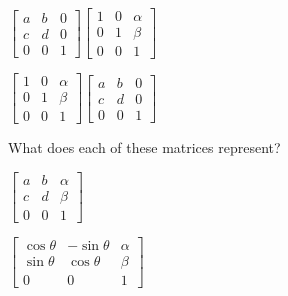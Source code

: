 \documentclass[../gatm_answers.tex]{subfiles}
\begin{document}
\begin{inner_problem}[start=1]
\item $\left[\begin{array}{ccc}a & b & 0 \\ c & d & 0 \\ 0 & 0 & 1 \end{array}\right]\left[\begin{array}{ccc} 1 & 0 & \alpha \\ 0 & 1 & \beta \\ 0 & 0 & 1 \end{array}\right]$
\end{inner_problem}

\begin{inner_problem}
\item $\left[\begin{array}{ccc} 1 & 0 & \alpha \\ 0 & 1 & \beta \\ 0 & 0 & 1 \end{array}\right]\left[\begin{array}{ccc}a & b & 0 \\ c & d & 0 \\ 0 & 0 & 1 \end{array}\right]$
\end{inner_problem}

\begin{outer_problem}
\item What does each of these matrices represent?
\end{outer_problem}

\begin{inner_problem}[start=1]
\item $\left[\begin{array}{ccc} a & b & \alpha \\ c & d & \beta \\ 0 & 0 & 1 \end{array}\right]$
\end{inner_problem}

\begin{inner_problem}
\item $\left[\begin{array}{ccc} \cos\theta & -\sin\theta & \alpha \\ \sin\theta & \cos\theta & \beta \\ 0 & 0 & 1 \end{array}\right]$
\end{inner_problem}
\end{document}
